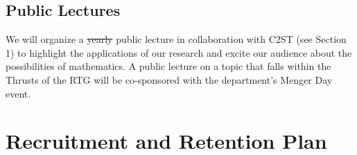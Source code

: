 \documentclass[11pt]{NSFamsart}
\begin{document}
\subsection*{Public Lectures} We will organize a \sout{\color{red}yearly} public lecture in collaboration with  C2ST (see Section 1) to highlight the applications of   our research and excite our audience about the possibilities of mathematics. 
A public lecture on a topic that falls within the Thrusts of the RTG will be co-sponsored  with the department's Menger Day event. 



\section{Recruitment and Retention Plan} \label{sec:RandR}
\end{document}
